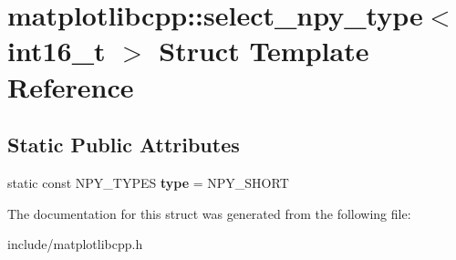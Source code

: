 \hypertarget{structmatplotlibcpp_1_1select__npy__type_3_01int16__t_01_4}{}\section{matplotlibcpp\+:\+:select\+\_\+npy\+\_\+type$<$ int16\+\_\+t $>$ Struct Template Reference}
\label{structmatplotlibcpp_1_1select__npy__type_3_01int16__t_01_4}
\subsection*{Static Public Attributes}
\begin{DoxyCompactItemize}
\item 
static const N\+P\+Y\+\_\+\+T\+Y\+P\+ES {\bfseries type} = N\+P\+Y\+\_\+\+S\+H\+O\+RT\hypertarget{structmatplotlibcpp_1_1select__npy__type_3_01int16__t_01_4_aa7e1803c594ccc58c2cd4c8818d5a158}{}\label{structmatplotlibcpp_1_1select__npy__type_3_01int16__t_01_4_aa7e1803c594ccc58c2cd4c8818d5a158}

\end{DoxyCompactItemize}


The documentation for this struct was generated from the following file\+:\begin{DoxyCompactItemize}
\item 
include/matplotlibcpp.\+h\end{DoxyCompactItemize}
